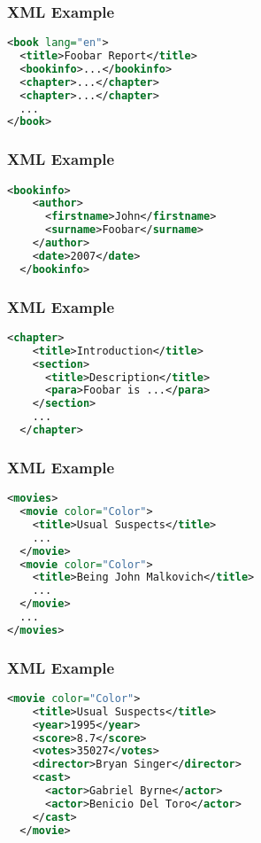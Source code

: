 \documentclass[dvipsnames]{beamer}
\theoremstyle{plain}
\begin{document}
\begin{frame}[fragile]
  \frametitle{XML Example}

  \begin{example}[DocBook]
    \begin{lstlisting}[language=XML]
<book lang="en">
  <title>Foobar Report</title>
  <bookinfo>...</bookinfo>
  <chapter>...</chapter>
  <chapter>...</chapter>
  ...
</book>
    \end{lstlisting}
  \end{example}
\end{frame}

\begin{frame}[fragile]
  \frametitle{XML Example}

  \begin{example}[DocBook]
    \begin{lstlisting}[language=XML]
  <bookinfo>
    <author>
      <firstname>John</firstname>
      <surname>Foobar</surname>
    </author>
    <date>2007</date>
  </bookinfo>
    \end{lstlisting}
  \end{example}
\end{frame}

\begin{frame}[fragile]
  \frametitle{XML Example}

  \begin{example}[DocBook]
    \begin{lstlisting}[language=XML]
  <chapter>
    <title>Introduction</title>
    <section>
      <title>Description</title>
      <para>Foobar is ...</para>
    </section>
    ...
  </chapter>
    \end{lstlisting}
  \end{example}
\end{frame}

\begin{frame}[fragile]
  \frametitle{XML Example}

  \begin{example}[movies]
    \begin{lstlisting}[language=XML]
<movies>
  <movie color="Color">
    <title>Usual Suspects</title>
    ...
  </movie>
  <movie color="Color">
    <title>Being John Malkovich</title>
    ...
  </movie>
  ...
</movies>
    \end{lstlisting}
  \end{example}
\end{frame}

\begin{frame}[fragile]
  \frametitle{XML Example}

  \begin{example}[movies]
    \begin{lstlisting}[language=XML]
  <movie color="Color">
    <title>Usual Suspects</title>
    <year>1995</year>
    <score>8.7</score>
    <votes>35027</votes>
    <director>Bryan Singer</director>
    <cast>
      <actor>Gabriel Byrne</actor>
      <actor>Benicio Del Toro</actor>
    </cast>
  </movie>
    \end{lstlisting}
  \end{example}
\end{frame}
\end{document}
